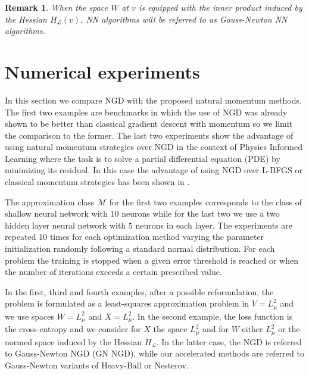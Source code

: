 \documentclass{article}
\theoremstyle{noparens}
\newtheorem{remark}{Remark}[section]
\newcommand{\cL}{\mathcal{L}}
\newcommand{\cM}{\mathcal{M}}
\begin{document}
\begin{remark}
When the space $W$ at $v$ is equipped with the inner product induced by the Hessian  $H_\cL(v)$, NN algorithms  will be referred to as Gauss-Newton NN algorithms.
\end{remark}

















\section{Numerical experiments}
\label{sec:numerics}

In this section we compare NGD with the proposed natural momentum methods. The first two examples are benchmarks
in which the use of NGD was already shown to be better than classical gradient descent with momentum \cite{parkAdaptiveNaturalGradient2000} so we limit the comparison to the former. The last two experiments show the advantage of using natural momentum strategies over NGD in the context of Physics Informed Learning where the task is to solve a partial differential equation (PDE) by minimizing its residual. In this case the advantage of using NGD over L-BFGS or classical momentum strategies has been shown in \cite{müllerAchievingHighAccuracy2023,schwenckeANaGRAMNaturalGradient2024,müllerPositionOptimizationSciML2024}.

The approximation class $\cM$ for the first two examples corresponds to the class of shallow neural network with $10$ neurons while for the last two we use a two hidden layer neural network with $5$ neurons in each layer. The experiments are repeated $10$ times for each optimization method varying the parameter initialization randomly following a standard normal distribution. For each problem the training is stopped when a given error threshold is reached or when the number of iterations exceeds a certain prescribed value.

In the first, third and fourth examples, after a possible reformulation, the problem is formulated as a least-squares approximation problem in $V = L^2_\mu$ and we use spaces $W=L^2_\mu$ and $ X = L^2_\mu$. In the second example, the loss function is the cross-entropy and we consider for $X$ the space $L^2_\mu$ and for $W$  either $L^2_\mu$ or the normed space induced by the Hessian $H_\cL$. In the latter case,  the NGD is referred to Gauss-Newton NGD (GN NGD), while our accelerated methods are referred to Gauss-Newton variants of Heavy-Ball or Nesterov.
\end{document}

